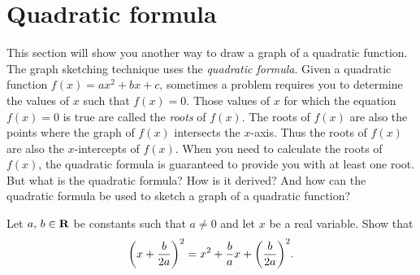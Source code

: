 \documentclass[a4paper,oneside,12pt]{article}
\begin{document}

\section{Quadratic formula}
\label{sec:quadratic_formula}

This section will show you another way to draw a graph of a quadratic
function.  The graph sketching technique uses the
\emph{quadratic formula}.  Given a quadratic function
$f(x) = ax^2 + bx + c$, sometimes a problem requires you to determine
the values of $x$ such that $f(x) = 0$.  Those values of $x$ for which
the equation $f(x) = 0$ is true are called the \emph{roots} of
$f(x)$.  The roots of $f(x)$ are also the points where the graph of
$f(x)$ intersects the $x$-axis.  Thus the roots of $f(x)$ are also the
$x$-intercepts of $f(x)$.  When you need to calculate the roots of
$f(x)$, the quadratic formula is guaranteed to provide you with at
least one root.  But what is the quadratic formula?  How is it
derived?  And how can the quadratic formula be used to sketch a graph
of a quadratic function?

\begin{exercise}
\label{ex:completing_the_square}
Let ${a},\, {b} \in \mathbf{R}$ be constants such that $a \neq 0$ and let
$x$ be a real variable.  Show that
\[
\parenthesis*{x + \frac{b}{2a}}^2
=
x^2 + \frac{b}{a} x + \parenthesis*{\frac{b}{2a}}^2.
\]
\end{exercise}
\end{document}

